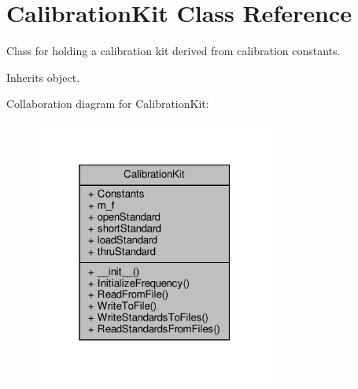 \hypertarget{classSignalIntegrity_1_1Measurement_1_1CalKit_1_1CalibrationKit_1_1CalibrationKit}{}\section{Calibration\+Kit Class Reference}
\label{classSignalIntegrity_1_1Measurement_1_1CalKit_1_1CalibrationKit_1_1CalibrationKit}


Class for holding a calibration kit derived from calibration constants.  




Inherits object.



Collaboration diagram for Calibration\+Kit\+:\nopagebreak
\begin{figure}[H]
\begin{center}
\leavevmode
\includegraphics[width=223pt]{classSignalIntegrity_1_1Measurement_1_1CalKit_1_1CalibrationKit_1_1CalibrationKit__coll__graph}
\end{center}
\end{figure}
